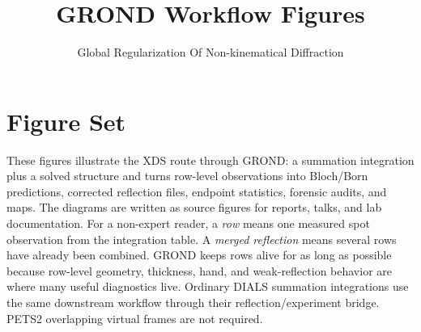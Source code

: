 \documentclass[10pt]{article}
\title{\sffamily\bfseries GROND Workflow Figures}
\author{\sffamily Global Regularization Of Non-kinematical Diffraction}
\date{}
\begin{document}
\maketitle
\thispagestyle{empty}

\section*{Figure Set}
These figures illustrate the XDS route through GROND: a summation integration plus a solved
structure and turns row-level observations into Bloch/Born predictions, corrected
reflection files, endpoint statistics, forensic audits, and maps. The diagrams
are written as source figures for reports, talks, and lab documentation. For a
non-expert reader, a \emph{row} means one measured spot observation from the
integration table. A \emph{merged reflection} means several rows have already
been combined. GROND keeps rows alive for as long as possible because row-level
geometry, thickness, hand, and weak-reflection behavior are where many useful
diagnostics live. Ordinary DIALS summation integrations use the same downstream
workflow through their reflection/experiment bridge. PETS2 overlapping virtual
frames are not required.

\clearpage
\end{document}
